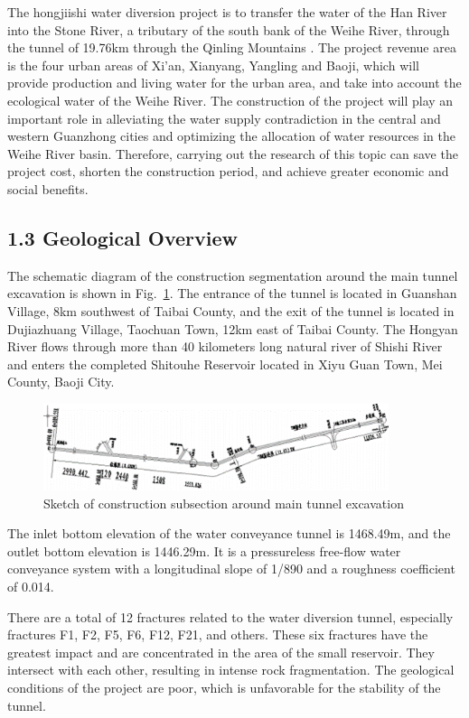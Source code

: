 \documentclass[11pt]{article}
\begin{document}
The hongjiishi water diversion project is to transfer the water of the Han River into the Stone River, a tributary of the south bank of the Weihe River, through the tunnel of 19.76km through the Qinling Mountains \parencite{bib7}. The project revenue area is the four urban areas of Xi'an, Xianyang, Yangling and Baoji, which will provide production and living water for the urban area, and take into account the ecological water of the Weihe River. The construction of the project will play an important role in alleviating the water supply contradiction in the central and western Guanzhong cities and optimizing the allocation of water resources in the Weihe River basin. Therefore, carrying out the research of this topic can save the project cost, shorten the construction period, and achieve greater economic and social benefits.

\subsection*{1.3 Geological Overview}
The schematic diagram of the construction segmentation around the main tunnel excavation is shown in Fig.~\ref{fig1}. The entrance of the tunnel is located in Guanshan Village, 8km southwest of Taibai County, and the exit of the tunnel is located in Dujiazhuang Village, Taochuan Town, 12km east of Taibai County. The Hongyan River flows through more than 40 kilometers long natural river of Shishi River and enters the completed Shitouhe Reservoir located in Xiyu Guan Town, Mei County, Baoji City.

\begin{figure}[h]
\centering
\includegraphics[width=0.9\textwidth]{mychart/22.png}
\caption{Sketch of construction subsection around main tunnel excavation \parencite{bib2}}\label{fig1}
\end{figure}

The inlet bottom elevation of the water conveyance tunnel is 1468.49m, and the outlet bottom elevation is 1446.29m. It is a pressureless free-flow water conveyance system with a longitudinal slope of 1/890 and a roughness coefficient of 0.014.

There are a total of 12 fractures related to the water diversion tunnel, especially fractures F1, F2, F5, F6, F12, F21, and others. These six fractures have the greatest impact and are concentrated in the area of the small reservoir. They intersect with each other, resulting in intense rock fragmentation. The geological conditions of the project are poor, which is unfavorable for the stability of the tunnel.
\end{document}
